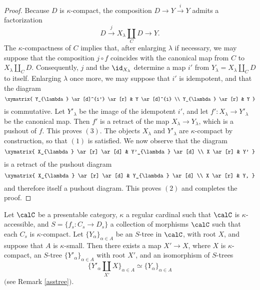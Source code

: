 \begin{CategoryTheory}
\begin{Didn't Read}
\begin{proof}
Because $D$ is $\kappa$-compact, the composition
$D \rightarrow Y \stackrel{i}{\rightarrow} Y$ admits a factorization
$$ D \stackrel{j}{\rightarrow} X_{\lambda} \coprod_{C} D \rightarrow Y.$$
The $\kappa$-compactness of $C$ implies that, after enlarging $\lambda$ if necessary, we may suppose that the composition $j \circ f$ coincides with the canonical map from $C$
to $X_{\lambda} \coprod_{C} D$. Consequently, $j$ and the $\id_{X_{\lambda}}$ determine
a map $i'$ from $Y_{\lambda} = X_{\lambda} \coprod_{C} D$ to itself. Enlarging $\lambda$ once more, we may suppose that $i'$ is idempotent, and that the diagram
$$ \xymatrix{ Y_{\lambda} \ar[d]^{i'} \ar[r] & Y \ar[d]^{i} \\
Y_{\lambda} \ar[r] & Y }$$
is commutative. Let $Y'_{\lambda}$ be the image of the idempotent $i'$, and let
$f': X_{\lambda} \rightarrow Y'_{\lambda}$ be the canonical map. Then $f'$ is a retract of the map
$X_{\lambda} \rightarrow Y_{\lambda}$, which is a pushout of $f$. This proves $(3)$. The objects
$X_{\lambda}$ and $Y'_{\lambda}$ are $\kappa$-compact by construction, so that $(1)$ is satisfied. We now observe that the diagram
$$ \xymatrix{ X_{\lambda} \ar[r] \ar[d] & Y'_{\lambda} \ar[d] \\
X \ar[r] & Y' }$$
is a retract of the pushout diagram
$$ \xymatrix{ X_{\lambda} \ar[r] \ar[d] & Y_{\lambda} \ar[d] \\
X \ar[r] & Y, }$$
and therefore itself a pushout diagram. This proves $(2)$ and completes the proof. 
\end{proof}

\begin{lemma}\label{tiura}
Let $\calC$ be a presentable category, $\kappa$ a regular cardinal such that $\calC$ is $\kappa$-accessible, and  $S = \{ f_s: C_s \rightarrow D_s \}$ a collection of morphisms $\calC$ such that each $C_s$ is $\kappa$-compact. Let $\{ Y_{\alpha} \}_{ \alpha \in A}$ be an $S$-tree in $\calC$,
with root $X$, and suppose that $A$ is $\kappa$-small. Then there exists a map
$X' \rightarrow X$, where $X$ is $\kappa$-compact, an $S$-tree
$\{ Y'_{\alpha} \}_{\alpha \in A}$ with root $X'$, and an isomorphism of $S$-trees
$$ \{ Y'_{\alpha} \coprod_{X'} X \}_{\alpha \in A} \simeq \{Y_{\alpha} \}_{\alpha \in A}$$
$($see Remark \ref{asstree}$)$. 
\end{lemma}


\end{Didn't Read}
\end{CategoryTheory}
